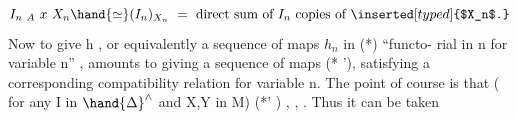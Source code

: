 \[ I_{n\ A} \ x \ X_n \hand{\simeq} (I_n)_{X_n} \ = \ \text{direct sum of } I_n \text{ copies of } \inserted[typed]{$X_n$.} \]
Now to give  h ,  or equivalently a sequence of maps $h_n$ in (*)  ``functo-%
rial in n for variable n'' ,  amounts to giving a sequence of maps (* '),
satisfying a corresponding compatibility relation  for variable n.  The
point of course is that  ( for any I in $\hand{\Delta}^{\wedge}$ and  X,Y  in M)  \hand{\uline{\textcolor{black}{the set of}}}
\hand{\uline{\textcolor{black}{data}}} (*' )  \hand{\uline{\textcolor{black}{plus the compatibility condition make}}} \hand{\uline{\textcolor{black}{a sense}}},  \hand{\uline{\textcolor{black}{formally}}},
\hand{\uline{\textcolor{black}{independently of}}}  \hand{\uline{\textcolor{black}{any exactness assumptions on A}}}.  Thus it can be taken

